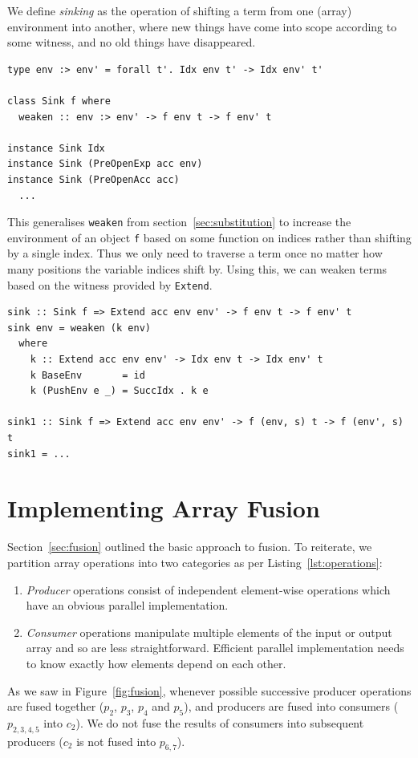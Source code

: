 We define \emph{sinking} as the operation of shifting a term from one (array)
environment into another, where new things have come into scope according to
some witness, and no old things have disappeared.
%
\begin{lstlisting}[style=haskell,caption={Sinking terms to a larger environment}]
type env :> env' = forall t'. Idx env t' -> Idx env' t'

class Sink f where
  weaken :: env :> env' -> f env t -> f env' t

instance Sink Idx
instance Sink (PreOpenExp acc env)
instance Sink (PreOpenAcc acc)
  ...
\end{lstlisting}
%
This generalises \texttt{weaken} from section~\ref{sec:substitution} to increase
the environment of an object \texttt{f} based on some function on indices rather
than shifting by a single  index. Thus we only need to
traverse a term once no matter how many positions the variable indices shift by.
Using this, we can weaken terms based on the witness provided by
\texttt{Extend}.
%
\begin{lstlisting}[style=haskell,firstnumber=last]
sink :: Sink f => Extend acc env env' -> f env t -> f env' t
sink env = weaken (k env)
  where
    k :: Extend acc env env' -> Idx env t -> Idx env' t
    k BaseEnv       = id
    k (PushEnv e _) = SuccIdx . k e

sink1 :: Sink f => Extend acc env env' -> f (env, s) t -> f (env', s) t
sink1 = ...
\end{lstlisting}


\section{Implementing Array Fusion}
\label{sec:implementing_array_fusion}

Section~\ref{sec:fusion} outlined the basic approach to fusion. To reiterate, we
partition array operations into two categories as per
Listing~\ref{lst:operations}:
%
\begin{enumerate}
    \item {}\emph{Producer} operations consist of independent
        element-wise operations which have an obvious parallel implementation.

    \item {}\emph{Consumer} operations manipulate multiple
        elements of the input or output array and so are less straightforward.
        Efficient parallel implementation needs to know exactly how elements
        depend on each other.
\end{enumerate}
%
As we saw in Figure~\ref{fig:fusion}, whenever possible successive producer
operations are fused together ($p_2$, $p_3$, $p_4$ and $p_5$), and producers are
fused into consumers ($p_{ 2,3,4,5 }$ into $ c_2$). We do not fuse the results
of consumers into subsequent producers ($c_2$ is not fused into $p_{ 6,7 }$).

